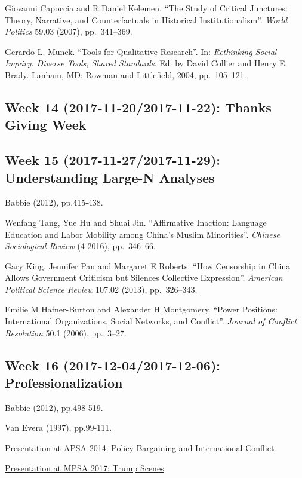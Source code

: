 \documentclass[11pt,]{article}
\theoremstyle{definition}
\theoremstyle{definition}
\theoremstyle{remark}
\begin{document}
Giovanni Capoccia and R Daniel Kelemen. ``The Study of Critical
Junctures: Theory, Narrative, and Counterfactuals in Historical
Institutionalism''. \emph{World Politics} 59.03 (2007), pp.~341--369.

Gerardo L. Munck. ``Tools for Qualitative Research''. In:
\emph{Rethinking Social Inquiry: Diverse Tools, Shared Standards}. Ed.
by David Collier and Henry E. Brady. Lanham, MD: Rowman and Littlefield,
2004, pp.~105--121.

\subsection{Week 14 (2017-11-20/2017-11-22): Thanks Giving
Week}\label{week-14-2017-11-202017-11-22-thanks-giving-week}

\subsection{Week 15 (2017-11-27/2017-11-29): Understanding Large-N
Analyses}\label{week-15-2017-11-272017-11-29-understanding-large-n-analyses}

Babbie (2012), pp.415-438.

Wenfang Tang, Yue Hu and Shuai Jin. ``Affirmative Inaction: Language
Education and Labor Mobility among China's Muslim Minorities''.
\emph{Chinese Sociological Review} (4 2016), pp.~346--66.

Gary King, Jennifer Pan and Margaret E Roberts. ``How Censorship in
China Allows Government Criticism but Silences Collective Expression''.
\emph{American Political Science Review} 107.02 (2013), pp.~326--343.

Emilie M Hafner-Burton and Alexander H Montgomery. ``Power Positions:
International Organizations, Social Networks, and Conflict''.
\emph{Journal of Conflict Resolution} 50.1 (2006), pp.~3--27.

\subsection{Week 16 (2017-12-04/2017-12-06):
Professionalization}\label{week-16-2017-12-042017-12-06-professionalization}

Babbie (2012), pp.498-519.

Van Evera (1997), pp.99-111.

\href{https://www.youtube.com/watch?v=bwNBXuz2eRg}{Presentation at APSA
2014: Policy Bargaining and International Conflict}

\href{https://www.youtube.com/watch?v=Z4ISkF2H4tk}{Presentation at MPSA
2017: Trump Scenes}
\end{document}
